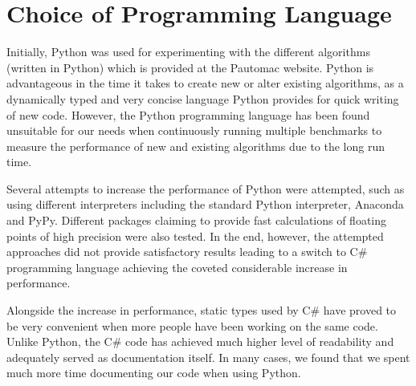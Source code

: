 \section{Choice of Programming Language}
Initially, Python was used for experimenting with the different algorithms (written in Python) which is provided at the Pautomac website. Python is advantageous in the time it takes to create new or alter existing algorithms, as a dynamically typed and very concise language Python provides for quick writing of new code. However, the Python programming language has been found unsuitable for our needs when continuously running multiple benchmarks to measure the performance of new and existing algorithms due to the long run time.

Several attempts to increase the performance of Python were attempted, such as using different interpreters including the standard Python interpreter, Anaconda and PyPy. Different packages claiming to provide fast calculations of floating points of high precision were also tested. In the end, however, the attempted approaches did not provide satisfactory results leading to a switch to C\# programming language achieving the coveted considerable increase in performance.

Alongside the increase in performance, static types used by  C\# have proved to be very convenient when more people have been working on the same code. Unlike Python, the C\# code has achieved much higher level of readability and adequately served as documentation itself. In many cases, we found that we spent much more time documenting our code when using Python.